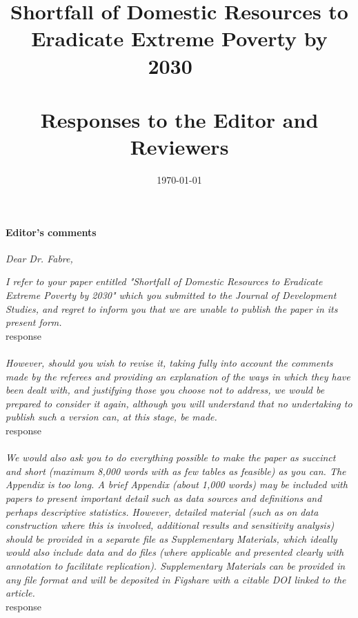 \documentclass[12pt,english]{article}
\title{Shortfall of Domestic Resources to Eradicate Extreme Poverty by 2030 ~\\ ~\\ \textbf{Responses to the Editor and Reviewers}}
\date{\today}
\begin{document}
	
\maketitle

\paragraph*{Editor's comments}

\textit{Dear Dr. Fabre,}

\textit{I refer to your paper entitled  "Shortfall of Domestic Resources to Eradicate Extreme Poverty by 2030" which you submitted to the Journal of Development Studies, and regret to inform you that we are unable to publish the paper in its present form.}~\\

response
~\\ ~\\

\textit{However, should you wish to revise it, taking fully into account the comments made by the referees and providing an explanation of the ways in which they have been dealt with, and justifying those you choose not to address, we would be prepared to consider it again, although you will understand that no undertaking to publish such a version can, at this stage, be made.}~\\

response
~\\ ~\\

\textit{We would also ask you to do everything possible to make the paper as succinct and short (maximum 8,000 words with as few tables as feasible) as you can. The Appendix is too long.  A brief Appendix (about 1,000 words) may be included with papers to present important detail such as data sources and definitions and perhaps descriptive statistics.  However, detailed material (such as on data construction where this is involved, additional results and sensitivity analysis) should be provided in a separate file as Supplementary Materials, which ideally would also include data and do files (where applicable and presented clearly with annotation to facilitate replication). Supplementary Materials can be provided in any file format and will be deposited in Figshare with a citable DOI linked to the article.}~\\

response
~\\ ~\\
\end{document}

